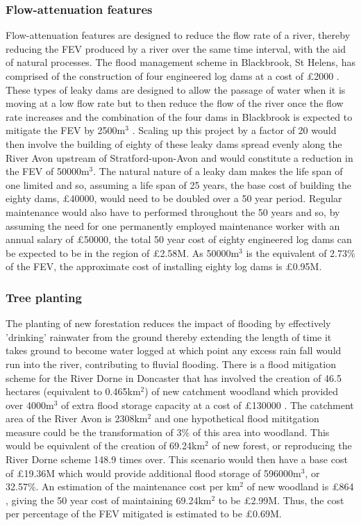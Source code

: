 \documentclass[11pt,a4paper]{article}
\begin{document}
\subsubsection{Flow-attenuation features}
Flow-attenuation features are designed to reduce the flow rate of a river, thereby reducing the FEV produced by a river over the same time interval, with the aid of natural processes. The flood management scheme in Blackbrook, St Helens, has comprised of the construction of four engineered log dams at a cost of \pounds2000 \cite{nfm}. These types of leaky dams are designed to allow the passage of water when it is moving at a low flow rate but to then reduce the flow of the river once the flow rate increases and the combination of the four dams in Blackbrook is expected to mitigate the FEV by 2500m$^3$ \cite{blackbrook}. Scaling up this project by a factor of 20 would then involve the building of eighty of these leaky dams spread evenly along the River Avon upstream of Stratford-upon-Avon and would constitute a reduction in the FEV of 50000m$^3$. The natural nature of a leaky dam makes the life span of one limited and so, assuming a life span of 25 years, the base cost of building the eighty dams, \pounds40000, would need to be doubled over a 50 year period. Regular maintenance would also have to performed throughout the 50 years and so, by assuming the need for one permanently employed maintenance worker with an annual salary of \pounds50000, the total 50 year cost of eighty engineered log dams can be expected to be in the region of \pounds2.58M. As 50000m$^3$ is the equivalent of 2.73\% of the FEV, the approximate cost of installing eighty log dams is \pounds0.95M.

\subsubsection{Tree planting}
The planting of new forestation reduces the impact of flooding by effectively 'drinking' rainwater from the ground thereby extending the length of time it takes ground to become water logged at which point any excess rain fall would run into the river, contributing to fluvial flooding. There is a flood mitigation scheme for the River Dorne in Doncaster that has involved the creation of 46.5 hectares (equivalent to 0.465km$^2$) of new catchment woodland which provided over 4000m$^3$ of extra flood storage capacity at a cost of \pounds130000 \cite{nfm}. The catchment area of the River Avon is 2308km$^2$ and one hypothetical flood mititgation measure could be the transformation of 3\% of this area into woodland. This would be equivalent of the creation of 69.24km$^2$ of new forest, or reproducing the River Dorne scheme 148.9 times over. This scenario would then have a base cost of \pounds19.36M which would provide additional flood storage of 596000m$^3$, or 32.57\%. An estimation of the maintenance cost per km$^2$ of new woodland is \pounds864 \cite{cost1}, giving the 50 year cost of maintaining 69.24km$^2$ to be \pounds2.99M. Thus, the cost per percentage of the FEV mitigated is estimated to be \pounds0.69M.
\end{document}

